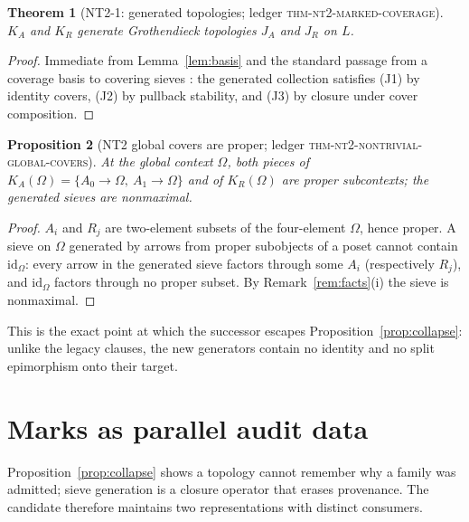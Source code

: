 \documentclass[11pt]{amsart}
\newtheorem{theorem}{Theorem}[section]
\newtheorem{proposition}[theorem]{Proposition}
\theoremstyle{definition}
\theoremstyle{remark}
\newcommand{\id}{\mathrm{id}}
\begin{document}
\begin{theorem}[NT2-1: generated topologies; \textnormal{ledger \textsc{thm-nt2-marked-coverage}}]\label{thm:nt2-1}
$K_A$ and $K_R$ generate Grothendieck topologies $J_A$ and $J_R$ on $L$.
\end{theorem}

\begin{proof}
Immediate from Lemma~\ref{lem:basis} and the standard passage from a coverage basis to covering sieves \cite{stacks00ZC}: the generated collection satisfies (J1) by identity covers, (J2) by pullback stability, and (J3) by closure under cover composition.
\end{proof}

\begin{proposition}[NT2 global covers are proper; \textnormal{ledger \textsc{thm-nt2-nontrivial-global-covers}}]\label{prop:proper}
At the global context $\Omega$, both pieces of $K_A(\Omega)=\{A_0\to\Omega,\ A_1\to\Omega\}$ and of $K_R(\Omega)$ are proper subcontexts; the generated sieves are nonmaximal.
\end{proposition}

\begin{proof}
$A_i$ and $R_j$ are two-element subsets of the four-element $\Omega$, hence proper. A sieve on $\Omega$ generated by arrows from proper subobjects of a poset cannot contain $\id_\Omega$: every arrow in the generated sieve factors through some $A_i$ (respectively $R_j$), and $\id_\Omega$ factors through no proper subset. By Remark~\ref{rem:facts}(i) the sieve is nonmaximal.
\end{proof}

This is the exact point at which the successor escapes Proposition~\ref{prop:collapse}: unlike the legacy clauses, the new generators contain no identity and no split epimorphism onto their target.

\section{Marks as parallel audit data}\label{sec:marks}

Proposition~\ref{prop:collapse} shows a topology cannot remember why a family was admitted; sieve generation is a closure operator that erases provenance. The candidate therefore maintains two representations with distinct consumers.
\end{document}
